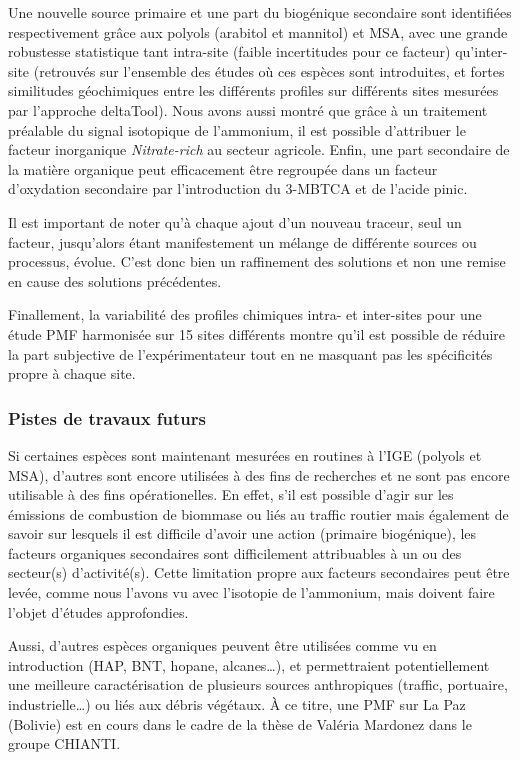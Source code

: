Une nouvelle source primaire et une part du biogénique secondaire sont identifiées
respectivement grâce aux polyols (arabitol et mannitol) et MSA, avec une grande robustesse
statistique tant intra-site (faible incertitudes pour ce facteur) qu'inter-site (retrouvés
sur l'ensemble des études où ces espèces sont introduites, et fortes similitudes
géochimiques entre les différents profiles sur différents sites mesurées par l'approche deltaTool).
Nous avons aussi montré que grâce à un traitement préalable du signal isotopique de
l'ammonium, il est possible d'attribuer le facteur inorganique \textit{Nitrate-rich} au
secteur agricole.
Enfin, une part secondaire de la matière organique peut efficacement être regroupée dans un
facteur d'oxydation secondaire par l'introduction du 3-MBTCA et de l'acide pinic.

Il est important de noter qu'à chaque ajout d'un nouveau traceur, seul un facteur,
jusqu'alors étant manifestement un mélange de différente sources ou processus, évolue.
C'est donc bien un raffinement des solutions et non une remise en cause des solutions
précédentes.

Finallement, la variabilité des profiles chimiques intra- et inter-sites pour une étude
PMF harmonisée sur 15 sites différents montre qu'il est possible de réduire la part
subjective de l'expérimentateur tout en ne masquant pas les spécificités propre à chaque
site.

\subsubsection{Pistes de travaux futurs}%
\label{ssub:pistes_de_travaux_futurs}

Si certaines espèces sont maintenant mesurées en routines à l'IGE (polyols et MSA),
d'autres sont encore utilisées à des fins de recherches et ne sont pas encore utilisable
à des fins opérationelles. En effet, s'il est possible d'agir sur les émissions de
combustion de biommase ou liés au traffic routier mais également de savoir sur lesquels
il est difficile d'avoir une action (primaire biogénique), les facteurs organiques
secondaires sont difficilement attribuables à un ou des secteur(s) d'activité(s). Cette
limitation propre aux facteurs secondaires peut être levée, comme nous l'avons vu avec
l'isotopie de l'ammonium, mais doivent faire l'objet d'études approfondies.

Aussi, d'autres espèces organiques peuvent être utilisées comme vu en introduction (HAP,
BNT, hopane, alcanes…), et permettraient potentiellement une meilleure caractérisation de
plusieurs sources anthropiques (traffic, portuaire, industrielle…) ou liés aux débris végétaux.
À ce titre, une PMF sur La Paz (Bolivie) est en cours dans le cadre de la thèse de Valéria
Mardonez dans le groupe CHIANTI.

